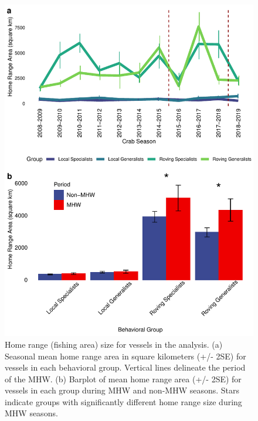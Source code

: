 \documentclass[]{elsarticle} %
\begin{document}
\begin{figure}%
\includegraphics [width=\linewidth]{fig_homerange.pdf}
\caption{Home range (fishing area) size for vessels in the analysis. (a) Seasonal mean home range area in square kilometers (+/- 2SE) for vessels in each behavioral group. Vertical lines delineate the period of the MHW. (b) Barplot of mean home range area (+/- 2SE) for vessels in each group during MHW and non-MHW seasons. Stars indicate groups with significantly different home range size during MHW seasons.}
\label{fig:homerange}
\end{figure}
\end{document}
